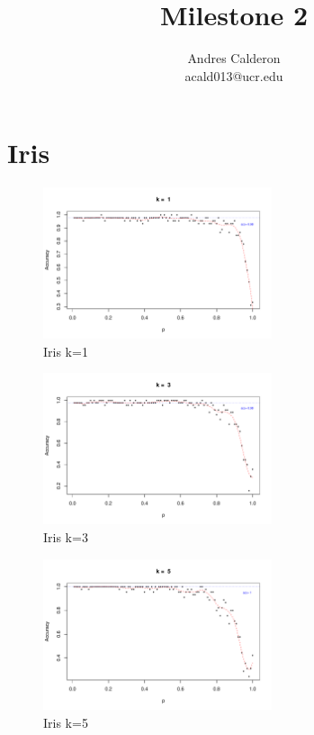 \documentclass{article}
\title{Milestone 2}
\author{Andres Calderon \\ acald013@ucr.edu}
\begin{document}
\maketitle

\section{Iris}

\begin{figure}[h!]
 \centering
 \includegraphics[width=0.6\textwidth]{./figures/Iris_k1.pdf}
 \caption{Iris k=1}
 \label{fig:iris1}
\end{figure}
\begin{figure}[h!]
 \centering
 \includegraphics[width=0.6\textwidth]{./figures/Iris_k3.pdf}
 \caption{Iris k=3}
 \label{fig:iris3}
\end{figure}
\begin{figure}
 \centering
 \includegraphics[width=0.6\textwidth]{./figures/Iris_k5.pdf}
 \caption{Iris k=5}
 \label{fig:iris5}
\end{figure}
\end{document}
